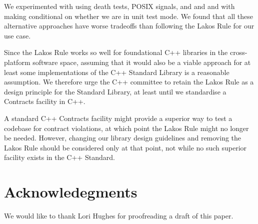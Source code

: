 We experimented with using death tests, POSIX signals, and  and  and with making  conditional on whether we are in unit test mode. We found that all these alternative approaches have worse tradeoffs than following the Lakos Rule for our use case.

Since the Lakos Rule works so well for foundational C++ libraries in the cross-platform software space, assuming that it would also be a viable approach for at least some implementations of the C++ Standard Library is a reasonable assumption. We therefore urge the C++ committee to retain the Lakos Rule as a design principle for the Standard Library, at least until we standardise a Contracts facility in C++.

A standard C++ Contracts facility might provide a superior way to test a codebase for contract violations, at which point the Lakos Rule might no longer be needed. However, changing our library design guidelines and removing the Lakos Rule should be considered only at that point, not while no such superior facility exists in the C++ Standard.



\section*{Acknowledegments}

We would like to thank Lori Hughes for proofreading a draft of this paper.

\renewcommand{\bibname}{References}



